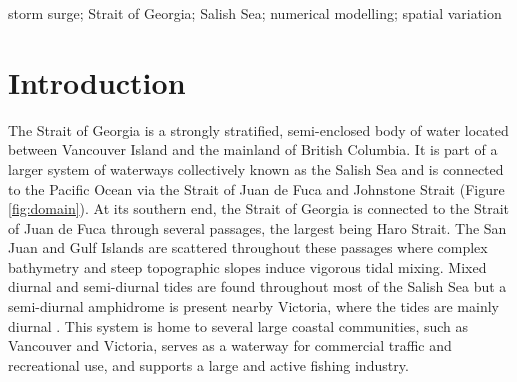 \documentclass{tATO2e}
\begin{document}
\begin{keywords}storm surge; Strait of Georgia; Salish Sea; numerical modelling; spatial variation
\end{keywords}

\section{Introduction}\label{sec:intro}


The Strait of Georgia is a strongly stratified, semi-enclosed body of water located between Vancouver Island and the mainland of British Columbia. It is part of a larger system of waterways collectively known as the Salish Sea and is connected to the Pacific Ocean via the Strait of Juan de Fuca and Johnstone Strait (Figure \ref{fig:domain}). At its southern end, the Strait of Georgia is connected to the Strait of Juan de Fuca through several passages, the largest being Haro Strait. The San Juan and Gulf Islands are scattered throughout these passages where complex bathymetry and steep topographic slopes induce vigorous tidal mixing.  Mixed diurnal and semi-diurnal tides are found throughout most of the Salish Sea but a semi-diurnal amphidrome is present nearby Victoria, where the tides are mainly diurnal \citep{thomson1981oceanography}. This system is home to several large coastal communities, such as Vancouver and Victoria, serves as a waterway for commercial traffic and recreational use, and supports a large and active fishing industry.   

\end{document}
